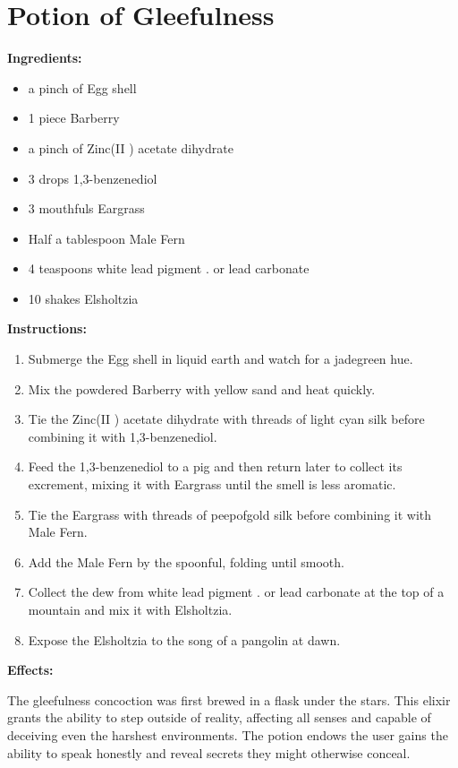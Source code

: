 \documentclass{article}
\begin{document}
\newpage
\section*{Potion of Gleefulness}

\textbf{Ingredients:}

\begin{itemize}
  \item a pinch of Egg shell
  \item 1 piece Barberry
  \item a pinch of Zinc(II ) acetate dihydrate
  \item 3 drops 1,3-benzenediol
  \item 3 mouthfuls Eargrass
  \item Half a tablespoon Male Fern
  \item 4 teaspoons white lead pigment . or lead carbonate
  \item 10 shakes Elsholtzia
\end{itemize}

\textbf{Instructions:}

\begin{enumerate}
  \item Submerge the Egg shell in liquid earth and watch for a jadegreen hue.
  \item Mix the powdered Barberry with yellow sand and heat quickly.
  \item Tie the Zinc(II ) acetate dihydrate with threads of light cyan silk before combining it with 1,3-benzenediol.
  \item Feed the 1,3-benzenediol to a pig and then return later to collect its excrement, mixing it with Eargrass until the smell is less aromatic.
  \item Tie the Eargrass with threads of peepofgold silk before combining it with Male Fern.
  \item Add the Male Fern by the spoonful, folding until smooth.
  \item Collect the dew from white lead pigment . or lead carbonate at the top of a mountain and mix it with Elsholtzia.
  \item Expose the Elsholtzia to the song of a pangolin at dawn.
\end{enumerate}

\textbf{Effects:}

The gleefulness concoction was first brewed in a flask under the stars. This elixir grants the ability to step outside of reality, affecting all senses and capable of deceiving even the harshest environments. The potion endows the user gains the ability to speak honestly and reveal secrets they might otherwise conceal.
\end{document}
